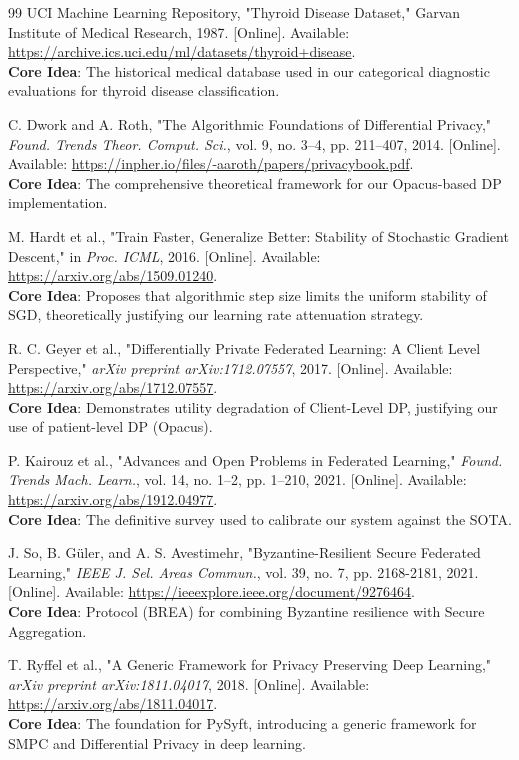 \documentclass[10pt, a4paper, twocolumn]{article}
\begin{document}
\begin{thebibliography}{99}
 UCI Machine Learning Repository, "Thyroid Disease Dataset," Garvan Institute of Medical Research, 1987. [Online]. Available: \url{https://archive.ics.uci.edu/ml/datasets/thyroid+disease}. \\
\textbf{Core Idea}: The historical medical database used in our categorical diagnostic evaluations for thyroid disease classification.

 C. Dwork and A. Roth, "The Algorithmic Foundations of Differential Privacy," \textit{Found. Trends Theor. Comput. Sci.}, vol. 9, no. 3–4, pp. 211–407, 2014. [Online]. Available: \url{https://inpher.io/files/-aaroth/papers/privacybook.pdf}. \\
\textbf{Core Idea}: The comprehensive theoretical framework for our Opacus-based DP implementation.

 M. Hardt et al., "Train Faster, Generalize Better: Stability of Stochastic Gradient Descent," in \textit{Proc. ICML}, 2016. [Online]. Available: \url{https://arxiv.org/abs/1509.01240}. \\
\textbf{Core Idea}: Proposes that algorithmic step size limits the uniform stability of SGD, theoretically justifying our learning rate attenuation strategy.

 R. C. Geyer et al., "Differentially Private Federated Learning: A Client Level Perspective," \textit{arXiv preprint arXiv:1712.07557}, 2017. [Online]. Available: \url{https://arxiv.org/abs/1712.07557}. \\
\textbf{Core Idea}: Demonstrates utility degradation of Client-Level DP, justifying our use of patient-level DP (Opacus).

 P. Kairouz et al., "Advances and Open Problems in Federated Learning," \textit{Found. Trends Mach. Learn.}, vol. 14, no. 1–2, pp. 1–210, 2021. [Online]. Available: \url{https://arxiv.org/abs/1912.04977}. \\
\textbf{Core Idea}: The definitive survey used to calibrate our system against the SOTA.

 J. So, B. Güler, and A. S. Avestimehr, "Byzantine-Resilient Secure Federated Learning," \textit{IEEE J. Sel. Areas Commun.}, vol. 39, no. 7, pp. 2168-2181, 2021. [Online]. Available: \url{https://ieeexplore.ieee.org/document/9276464}. \\
\textbf{Core Idea}: Protocol (BREA) for combining Byzantine resilience with Secure Aggregation.

 T. Ryffel et al., "A Generic Framework for Privacy Preserving Deep Learning," \textit{arXiv preprint arXiv:1811.04017}, 2018. [Online]. Available: \url{https://arxiv.org/abs/1811.04017}. \\
\textbf{Core Idea}: The foundation for PySyft, introducing a generic framework for SMPC and Differential Privacy in deep learning.


\end{thebibliography}
\end{document}
